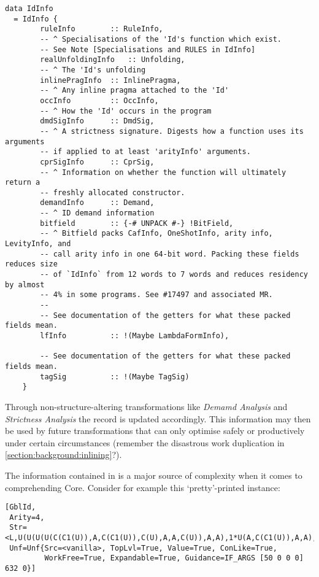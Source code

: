 \begin{listing}[H]
\begin{verbatim}
data IdInfo
  = IdInfo {
        ruleInfo        :: RuleInfo,
        -- ^ Specialisations of the 'Id's function which exist.
        -- See Note [Specialisations and RULES in IdInfo]
        realUnfoldingInfo   :: Unfolding,
        -- ^ The 'Id's unfolding
        inlinePragInfo  :: InlinePragma,
        -- ^ Any inline pragma attached to the 'Id'
        occInfo         :: OccInfo,
        -- ^ How the 'Id' occurs in the program
        dmdSigInfo      :: DmdSig,
        -- ^ A strictness signature. Digests how a function uses its arguments
        -- if applied to at least 'arityInfo' arguments.
        cprSigInfo      :: CprSig,
        -- ^ Information on whether the function will ultimately return a
        -- freshly allocated constructor.
        demandInfo      :: Demand,
        -- ^ ID demand information
        bitfield        :: {-# UNPACK #-} !BitField,
        -- ^ Bitfield packs CafInfo, OneShotInfo, arity info, LevityInfo, and
        -- call arity info in one 64-bit word. Packing these fields reduces size
        -- of `IdInfo` from 12 words to 7 words and reduces residency by almost
        -- 4% in some programs. See #17497 and associated MR.
        --
        -- See documentation of the getters for what these packed fields mean.
        lfInfo          :: !(Maybe LambdaFormInfo),

        -- See documentation of the getters for what these packed fields mean.
        tagSig          :: !(Maybe TagSig)
    }
\end{verbatim}
\end{listing}

Through non-structure-altering transformations like \textit{Demamd Analysis} and \textit{Strictness Analysis} the 
record is updated accordingly. This information may then be used by future transformations that can only optimise safely or
productively under certain circumstances (remember the disastrous work duplication in \cref{section:background:inlining}?).

The information contained in  is a major source of complexity when it comes to comprehending Core. Consider
for example this `pretty'-printed  instance:

\begin{listing}[H]
\begin{verbatim}
[GblId,
 Arity=4,
 Str=<L,U(U(U(U(C(C1(U)),A,C(C1(U)),C(U),A,A,C(U)),A,A),1*U(A,C(C1(U)),A,A),A,A,A,A,A),U(A,A,C(U),...etc.
 Unf=Unf{Src=<vanilla>, TopLvl=True, Value=True, ConLike=True,
         WorkFree=True, Expandable=True, Guidance=IF_ARGS [50 0 0 0] 632 0}]
\end{verbatim}
\end{listing}

